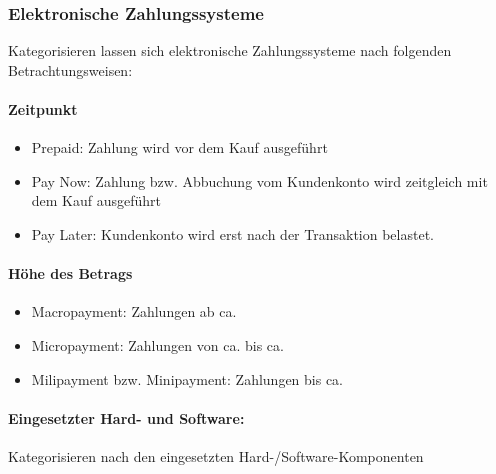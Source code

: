 \subsubsection{Elektronische Zahlungssysteme}
Kategorisieren lassen sich elektronische Zahlungssysteme nach folgenden Betrachtungsweisen:
\paragraph{Zeitpunkt}
\begin{itemize}
     \item Prepaid: Zahlung wird vor dem Kauf ausgeführt
     \item Pay Now: Zahlung bzw. Abbuchung vom Kundenkonto wird zeitgleich mit dem Kauf ausgeführt
     \item Pay Later: Kundenkonto wird erst nach der Transaktion belastet.
\end{itemize}

\paragraph{Höhe des Betrags}
\begin{itemize}
     \item Macropayment: Zahlungen ab ca. 
     \item Micropayment: Zahlungen von ca.  bis ca. 
     \item Milipayment bzw. Minipayment: Zahlungen bis ca. 
\end{itemize}

\paragraph{Eingesetzter Hard- und Software:} Kategorisieren nach den eingesetzten Hard-/Software-Komponenten

